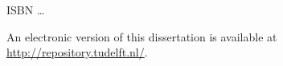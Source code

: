 \begin{titlepage}
\vspace{\bigskipamount}



\noindent ISBN \ldots

\medskip
\noindent An electronic version of this dissertation is available at \\
\url{http://repository.tudelft.nl/}.

\end{titlepage}


